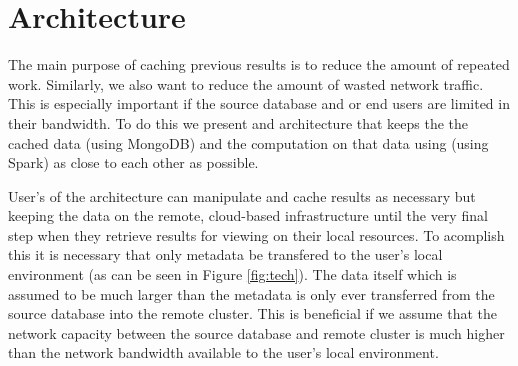 \documentclass[conference,twoside]{IEEEtran}
\begin{document}
\section{Architecture}
The main purpose of caching previous results is to reduce the amount of repeated work. Similarly, we also want to reduce the amount of wasted network traffic. This is especially important if the source database and or end users are limited in their bandwidth. To do this we present and architecture that keeps the the cached data (using MongoDB) and the computation on that data using (using Spark) as close to each other as possible.

User's of the architecture can manipulate and cache results as necessary but keeping the data on the remote, cloud-based infrastructure until the very final step when they retrieve results for viewing on their local resources. To acomplish this it is necessary that only metadata be transfered to the user's local environment (as can be seen in Figure \ref{fig:tech}). The data itself which is assumed to be much larger than the metadata is only ever transferred from the source database into the remote cluster. This is beneficial if we assume that the network capacity between the source database and remote cluster is much higher than the network bandwidth available to the user's local environment.
\end{document}

